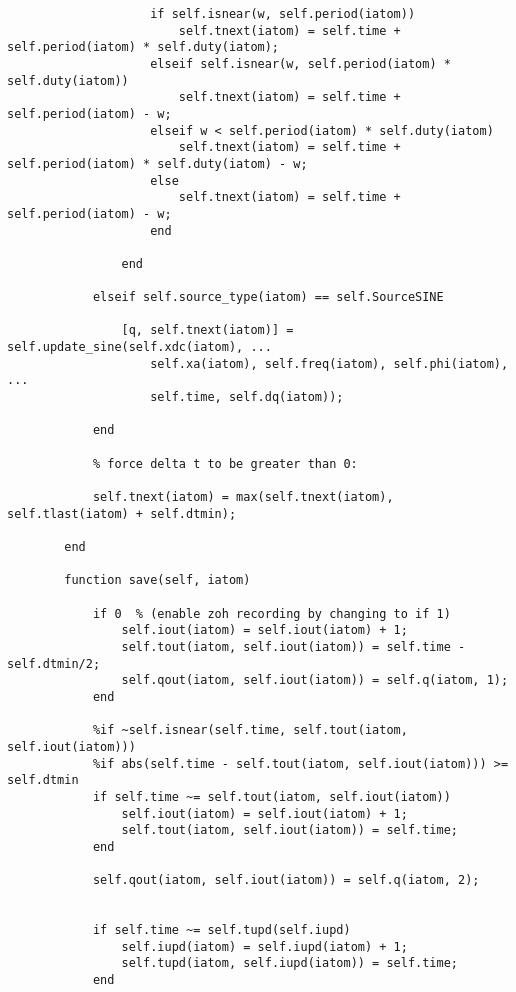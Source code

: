 \begin{lstlisting}
                    if self.isnear(w, self.period(iatom))
                        self.tnext(iatom) = self.time + self.period(iatom) * self.duty(iatom);
                    elseif self.isnear(w, self.period(iatom) * self.duty(iatom))
                        self.tnext(iatom) = self.time + self.period(iatom) - w; 
                    elseif w < self.period(iatom) * self.duty(iatom)
                        self.tnext(iatom) = self.time + self.period(iatom) * self.duty(iatom) - w;
                    else
                        self.tnext(iatom) = self.time + self.period(iatom) - w;
                    end

                end
            
            elseif self.source_type(iatom) == self.SourceSINE
                
                [q, self.tnext(iatom)] = self.update_sine(self.xdc(iatom), ...
                    self.xa(iatom), self.freq(iatom), self.phi(iatom), ...
                    self.time, self.dq(iatom));
                
            end
            
            % force delta t to be greater than 0:
            
            self.tnext(iatom) = max(self.tnext(iatom), self.tlast(iatom) + self.dtmin);
            
        end
        
        function save(self, iatom) 
            
            if 0  % (enable zoh recording by changing to if 1)
                self.iout(iatom) = self.iout(iatom) + 1;
                self.tout(iatom, self.iout(iatom)) = self.time - self.dtmin/2;
                self.qout(iatom, self.iout(iatom)) = self.q(iatom, 1);
            end
            
            %if ~self.isnear(self.time, self.tout(iatom, self.iout(iatom)))
            %if abs(self.time - self.tout(iatom, self.iout(iatom))) >= self.dtmin
            if self.time ~= self.tout(iatom, self.iout(iatom))
                self.iout(iatom) = self.iout(iatom) + 1;
                self.tout(iatom, self.iout(iatom)) = self.time;           
            end
            
            self.qout(iatom, self.iout(iatom)) = self.q(iatom, 2); 

            
            if self.time ~= self.tupd(self.iupd)
                self.iupd(iatom) = self.iupd(iatom) + 1;
                self.tupd(iatom, self.iupd(iatom)) = self.time;
            end
            

\end{lstlisting}
